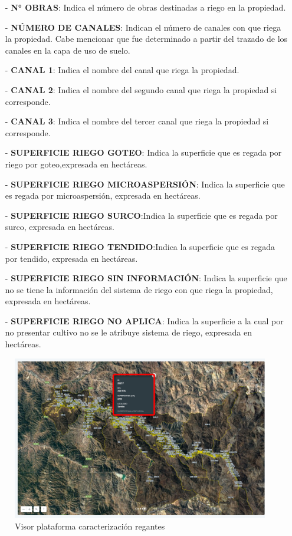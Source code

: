 \documentclass[10pt]{article}
\begin{document}
\begin{itemize}
\item[-]\textbf{N° OBRAS}: Indica el número de obras destinadas a riego en la propiedad.
\item[-]\textbf{NÚMERO DE CANALES}: Indican el número de canales con que riega la propiedad. Cabe mencionar que fue determinado a partir del trazado de los canales en la capa de uso de suelo.
\item[-]\textbf{CANAL 1}: Indica el nombre del canal que riega la propiedad.
\item[-]\textbf{CANAL 2}: Indica el nombre del segundo canal que riega la propiedad si corresponde.
\item[-]\textbf{CANAL 3}: Indica el nombre del tercer canal que riega la propiedad si corresponde.
\item[-]\textbf{SUPERFICIE RIEGO GOTEO}: Indica la superficie que es regada por riego por goteo,expresada en hectáreas.
\item[-]\textbf{SUPERFICIE RIEGO MICROASPERSIÓN}: Indica la superficie que es regada por microaspersión, expresada en hectáreas.
\item[-]\textbf{SUPERFICIE RIEGO SURCO}:Indica la superficie que es regada por surco, expresada en hectáreas.
\item[-]\textbf{SUPERFICIE RIEGO TENDIDO}:Indica la superficie que es regada por tendido, expresada en hectáreas.
\item[-]\textbf{SUPERFICIE RIEGO SIN INFORMACIÓN}: Indica la superficie que no se tiene la información del sistema de riego con que riega la propiedad, expresada en hectáreas.
\item[-]\textbf{SUPERFICIE RIEGO NO APLICA}: Indica la superficie a la cual por no presentar cultivo no se le atribuye sistema de riego, expresada en hectáreas.
\end{itemize}

\begin{figure}[H]
\centering
\includegraphics[scale=0.5]{Figuras_manual/visorregantes.png}
\caption{Visor plataforma caracterización regantes}
\label{10}
\end{figure}
\end{document}
